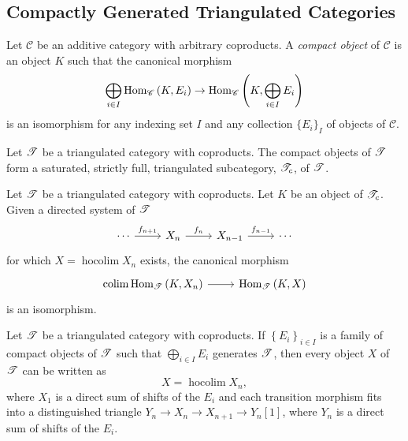 \documentclass[dissertation.tex]{subfiles}
\begin{document}
\subsection{Compactly Generated Triangulated Categories}
\begin{defn}
  Let $\mathscr{C}$ be an additive category with arbitrary coproducts.
  A {\it compact object} of $\mathscr{C}$ is an object $K$ such that the canonical morphism
  $$\bigoplus_{i \in I} \operatorname{Hom}_{\mathscr{C}}\left(K, E_i\right) \rightarrow \operatorname{Hom}_{\mathscr{C}}\left(K, \bigoplus_{i \in I}E_i\right)$$
  is an isomorphism for any indexing set $I$ and any collection $\{E_i\}_I$ of objects of $\mathscr{C}$.
\end{defn}

\begin{lem}\label{compactobjstriangulated}
  Let $\mathscr{T}$ be a triangulated category with coproducts.
  The compact objects of $\mathscr{T}$ form a saturated, strictly full, triangulated subcategory, $\mathscr{T}_c$, of $\mathscr{T}$.
\end{lem}

\begin{lem}\label{homhocolimiscolim}
  Let $\mathscr{T}$ be a triangulated category with coproducts.
  Let $K$ be an object of $\mathscr{T}_c$.
  Given a directed system of $\mathscr{T}$
  $$\begin{tikzcd}
    \cdots \arrow{r}{f_{n+1}} & X_n \arrow{r}{f_n} & X_{n-1} \arrow{r}{f_{n-1}} & \cdots
  \end{tikzcd}$$
  for which $X = \operatorname{hocolim}X_n$ exists, the canonical morphism
  $$\begin{tikzcd}
    \operatorname{colim} \Hom{\T}{K,X_n} \arrow{r} & \Hom{\T}{K,X}
  \end{tikzcd}$$
  is an isomorphism.
\end{lem}

\begin{lem}\label{hocolim}
  Let $\mathscr{T}$ be a triangulated category with coproducts.
  If $\left\{E_i\right\}_{i \in I}$ is a family of compact objects of $\mathscr{T}$ such that $\bigoplus_{i \in I}{E_i}$ generates $\mathscr{T}$, then every object $X$ of $\mathscr{T}$ can be written as 
  $$X = \operatorname{hocolim}X_n,$$
  where $X_1$ is a direct sum of shifts of the $E_i$ and each transition morphism fits into a distinguished triangle $Y_n \rightarrow X_n \rightarrow X_{n+1} \rightarrow Y_n[1]$, where $Y_n$ is a direct sum of shifts of the $E_i$.
\end{lem}
\end{document}
